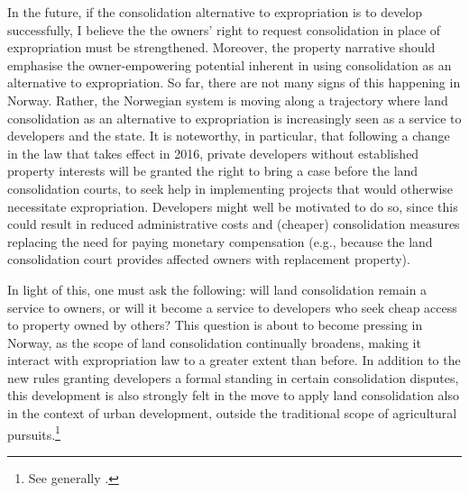 In the future, if the consolidation alternative to expropriation is to develop successfully, I believe the the owners' right to request consolidation in place of expropriation must be strengthened. Moreover, the property narrative should emphasise the owner-empowering potential inherent in using consolidation as an alternative to expropriation. So far, there are not many signs of this happening in Norway. Rather, the Norwegian system is moving along a trajectory where land consolidation as an alternative to expropriation is increasingly seen as a service to developers and the state. It is noteworthy, in particular, that following a change in the law that takes effect in 2016, private developers without established property interests will be granted the right to bring a case before the land consolidation courts, to seek help in implementing projects that would otherwise necessitate expropriation. Developers might well be motivated to do so, since this could result in reduced administrative costs and (cheaper) consolidation measures replacing the need for paying monetary compensation (e.g., because the land consolidation court provides affected owners with replacement property).

In light of this, one must ask the following: will land consolidation remain a service to owners, or will it become a service to developers who seek cheap access to property owned by others? This question is about to become pressing in Norway, as the scope of land consolidation continually broadens, making it interact with expropriation law to a greater extent than before. In addition to the new rules granting developers a formal standing in certain consolidation disputes, this development is also strongly felt in the move to apply land consolidation also in the context of urban development, outside the traditional scope of agricultural pursuits.\footnote{See generally \cite{stenseth07}.}


